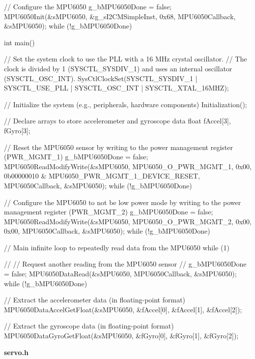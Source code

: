 \documentclass[12pt, a4paper]{article}
\begin{document}
\begin{code}
{    // Configure the MPU6050
    g_bMPU6050Done = false;
    MPU6050Init(&sMPU6050, &g_sI2CMSimpleInst, 0x68, MPU6050Callback, &sMPU6050);
    while (!g_bMPU6050Done)
    {
    }

}

int main()
{
    // Set the system clock to use the PLL with a 16 MHz crystal oscillator.
    // The clock is divided by 1 (SYSCTL_SYSDIV_1) and uses an internal oscillator (SYSCTL_OSC_INT).
    SysCtlClockSet(SYSCTL_SYSDIV_1 | SYSCTL_USE_PLL | SYSCTL_OSC_INT | SYSCTL_XTAL_16MHZ);

    // Initialize the system (e.g., peripherals, hardware components)
    Initialization();

    // Declare arrays to store accelerometer and gyroscope data
    float fAccel[3], fGyro[3];

    // Reset the MPU6050 sensor by writing to the power management register (PWR_MGMT_1)
    g_bMPU6050Done = false;
    MPU6050ReadModifyWrite(&sMPU6050, MPU6050_O_PWR_MGMT_1, 0x00, 0b00000010 & MPU6050_PWR_MGMT_1_DEVICE_RESET, MPU6050Callback, &sMPU6050);
    while (!g_bMPU6050Done)
    {
    }

    // Configure the MPU6050 to not be low power mode by writing to the power management register (PWR_MGMT_2)
    g_bMPU6050Done = false;
    MPU6050ReadModifyWrite(&sMPU6050, MPU6050_O_PWR_MGMT_2, 0x00, 0x00, MPU6050Callback, &sMPU6050);
    while (!g_bMPU6050Done)
    {
    }

    // Main infinite loop to repeatedly read data from the MPU6050
    while (1)
    {
        //
        // Request another reading from the MPU6050 sensor
        //
        g_bMPU6050Done = false;
        MPU6050DataRead(&sMPU6050, MPU6050Callback, &sMPU6050);
        while (!g_bMPU6050Done)
        {
        }

        // Extract the accelerometer data (in floating-point format)
        MPU6050DataAccelGetFloat(&sMPU6050, &fAccel[0], &fAccel[1], &fAccel[2]);

        // Extract the gyroscope data (in floating-point format)
        MPU6050DataGyroGetFloat(&sMPU6050, &fGyro[0], &fGyro[1], &fGyro[2]);
    }
}
\end{code}
\textbf{\newline servo.h}
\end{document}
